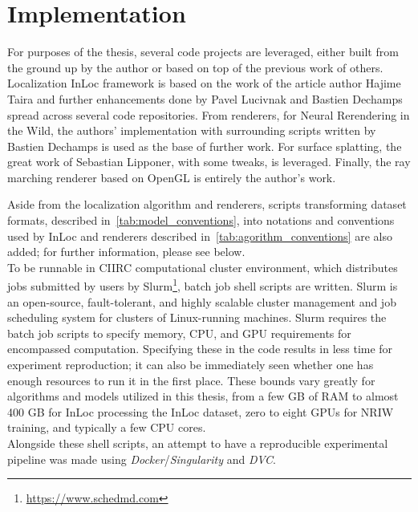 \section{Implementation}

For purposes of the thesis, several code projects are leveraged, either built from the
ground up by the author or based on top of the previous work of others.  Localization
InLoc framework is based on the work of the article author Hajime Taira and further
enhancements done by Pavel Lucivnak and Bastien Dechamps spread across several code
repositories. From renderers, for Neural Rerendering in the Wild, the authors'
implementation with surrounding scripts written by Bastien Dechamps is used as the base of
further work. For surface splatting, the great work of Sebastian Lipponer, with some
tweaks, is leveraged. Finally, the ray marching renderer based on OpenGL is entirely the
author's work.

Aside from the localization algorithm and renderers, scripts transforming dataset formats,
described in~\cref{tab:model_conventions}, into notations and conventions used by InLoc
and renderers described in~\cref{tab:agorithm_conventions} are also added; for further
information, please see below.\\

To be runnable in CIIRC computational cluster environment, which distributes jobs
submitted by users by Slurm\footnote{\url{https://www.schedmd.com}}, batch job shell
scripts are written. Slurm is an open-source, fault-tolerant, and highly scalable cluster
management and job scheduling system for clusters of Linux-running machines. Slurm
requires the batch job scripts to specify memory, CPU, and GPU requirements for
encompassed computation. Specifying these in the code results in less time for experiment
reproduction; it can also be immediately seen whether one has enough resources to run it
in the first place. These bounds vary greatly for algorithms and models utilized in this
thesis, from a few GB of RAM to almost 400 GB for InLoc processing the InLoc dataset, zero
to eight GPUs for NRIW training, and typically a few CPU cores.\\

Alongside these shell scripts, an attempt to have a reproducible experimental pipeline was
made using \emph{Docker}/\emph{Singularity} and \emph{DVC}.

